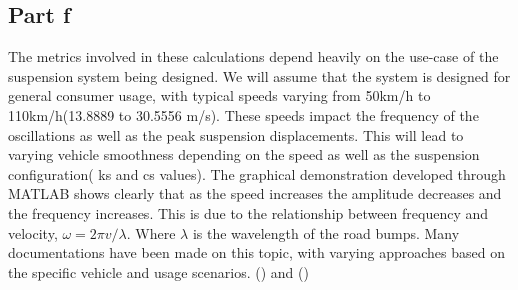 \documentclass[11pt]{article}
\begin{document}
\subsection{Part f}
\label{sec:org5621049}
The metrics involved in these calculations depend heavily on the use-case of the suspension system being designed. We will assume that the system is designed for general consumer usage, with typical speeds varying from 50km/h to 110km/h(13.8889 to 30.5556 m/s). These speeds impact the frequency of the oscillations as well as the peak suspension displacements. This will lead to varying vehicle smoothness depending on the speed as well as the suspension configuration( ks and cs values). The graphical demonstration developed through MATLAB shows clearly that as the speed increases the amplitude decreases and the frequency increases. This is due to the relationship between frequency and velocity, \(\omega =2\pi v/\lambda\). Where \(\lambda\) is the wavelength of the road bumps. Many documentations have been made on this topic, with varying approaches based on the specific vehicle and usage scenarios.
(\cite{collimator2024}) and
(\cite{Optimization_of_vehicle_suspension_parameters_with_use_of_evolutionary_computation})
\newpage
\printbibliography
\newpage
\end{document}
